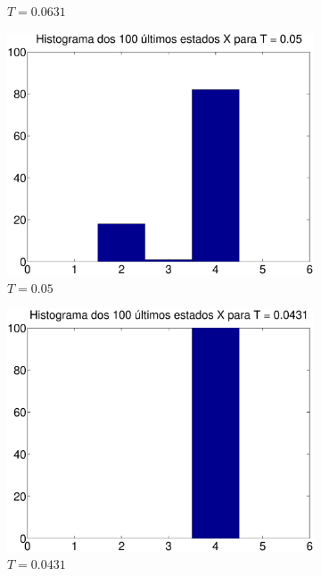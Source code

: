 \documentclass{report}
\begin{document}
\begin{figure}
\begin{subfigure}{0.32\textwidth}
		\caption{$T = 0.0631$}
	\end{subfigure}
		\begin{subfigure}{0.32\textwidth}
		\centering
		\includegraphics[width = \textwidth]{Q2_e_histograma_x_t_3}
		\caption{$T = 0.05$}
	\end{subfigure}
		\begin{subfigure}{0.32\textwidth}
		\centering
		\includegraphics[width = \textwidth]{Q2_e_histograma_x_t_4}
		\caption{$T = 0.0431$}
	\end{subfigure}
		\begin{subfigure}{0.32\textwidth}
		\centering

\end{subfigure}
\end{figure}
\end{document}
